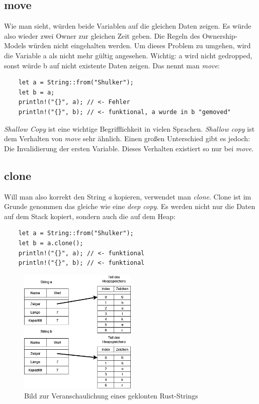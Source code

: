 \subsection{move}
Wie man sieht, würden beide Variablen auf die gleichen Daten zeigen. Es würde also wieder zwei Owner zur gleichen Zeit geben. Die Regeln des Ownership-Models würden
nicht eingehalten werden. Um dieses Problem zu umgehen, wird die Variable a als nicht mehr gültig angesehen. Wichtig: a wird nicht gedropped, sonst
würde b auf nicht existente Daten zeigen. Das nennt man \textit{move}:
\begin{lstlisting}
    let a = String::from("Shulker");
    let b = a;
    println!("{}", a); // <- Fehler
    println!("{}", b); // <- funktional, a wurde in b "gemoved"
\end{lstlisting}
\textit{Shallow Copy} ist eine wichtige Begrifflichkeit in vielen Sprachen. \textit{Shallow copy} ist dem Verhalten von \textit{move} sehr ähnlich. Einen
großen Unterschied gibt es jedoch: Die Invalidierung der ersten Variable. Dieses Verhalten existiert so nur bei \textit{move}.

\subsection{clone}
Will man also korrekt den String \textit{a} kopieren, verwendet man \textit{clone}. Clone ist im Grunde genommen das gleiche wie eine \textit{deep copy}.
Es werden nicht nur die Daten auf dem Stack kopiert, sondern auch die auf dem Heap:
\begin{lstlisting}
    let a = String::from("Shulker");
    let b = a.clone();
    println!("{}", a); // <- funktional
    println!("{}", b); // <- funktional
\end{lstlisting}
\begin{figure}[H]
    \begin{center}
        \includegraphics[width=0.5\textwidth]{images/rust/string_clone_repr.png}
        \caption{Bild zur Veranschaulichung eines geklonten Rust-Strings}
    \end{center}
\end{figure}

